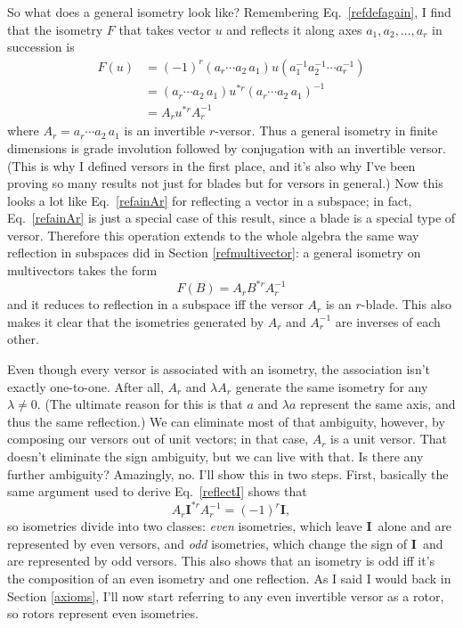 \documentclass{utarticle}
\newcommand{\bl}[1]{\ensuremath{\bm{#1}}}
\newcommand{\I}{\bl{I}}
\newcommand{\grinv}[2][]{\ensuremath{#2^{*#1}}}
\begin{document}
So what does a general isometry look like?  Remembering Eq.~\eqref{refdefagain}, I find that 
the isometry $F$ that takes vector $u$ and reflects it along axes $a_1, a_2, \dotsc, a_r$ in succession is
\begin{align}
F(u) & = (-1)^r(a_r \dotsb a_2 \, a_1) u (a_1^{-1} a_2^{-1} \dotsb a_r^{-1}) \nonumber \\
        & =  (a_r \dotsb a_2 \, a_1) \grinv[r]{u} (a_r \dotsb a_2 \, a_1)^{-1} \nonumber \\
        & = A_r \grinv[r]{u} A_r^{-1}
\end{align}
where $A_r = a_r \dotsb a_2 \, a_1$ is an invertible $r$-versor.  Thus a general isometry in finite dimensions
is grade involution followed by conjugation with an invertible versor.  (This is why I defined versors in the 
first place, and it's also why I've been proving so many results not just for blades but for versors in
general.)  Now this looks a lot like Eq.~\eqref{refainAr} for reflecting a vector in a subspace; in 
fact, Eq.~\eqref{refainAr} is just a special case of this result, since a blade is a special type of versor.
Therefore this operation extends to the whole algebra the same way reflection in 
subspaces did in Section \ref{refmultivector}: a general isometry on multivectors takes the form
\begin{equation} F(B) = A_r \grinv[r]{B} A_r^{-1} \end{equation}
and it reduces to reflection in a subspace iff the versor $A_r$ is an $r$-blade.  This also makes it
clear that the isometries generated by $A_r$ and $A_r^{-1}$ are inverses of each other.

Even though every versor is associated with an isometry, the association isn't exactly 
one-to-one.  After all, $A_r$ and $\lambda A_r$ generate the same isometry for any $\lambda \neq 0$.
(The ultimate reason for this is that $a$ and $\lambda a$ represent the same axis, and thus the same
reflection.)  We can eliminate most of that ambiguity, however, by composing our versors out of 
unit vectors; in that case, $A_r$ is a unit versor.  That doesn't eliminate the sign ambiguity, but we 
can live with that.  Is there any further ambiguity?  Amazingly, no.  I'll show this in two steps.  First,
basically the same argument used to derive Eq.~\eqref{reflectI} shows that 
\begin{equation} A_r \grinv[r]{\I} A_r^{-1} = (-1)^r \I, \label{orthI} \end{equation}
so isometries divide into two classes: \emph{even} isometries, which leave \I\ alone and are 
represented by even versors, and \emph{odd} isometries, which change the sign of \I\ and
are represented by odd versors.  This also shows that an isometry is odd iff it's the composition of an 
even isometry and one reflection.  As I said I would back in Section \ref{axioms}, I'll now start
referring to any even invertible versor as a rotor, so rotors represent even isometries.
\end{document}
